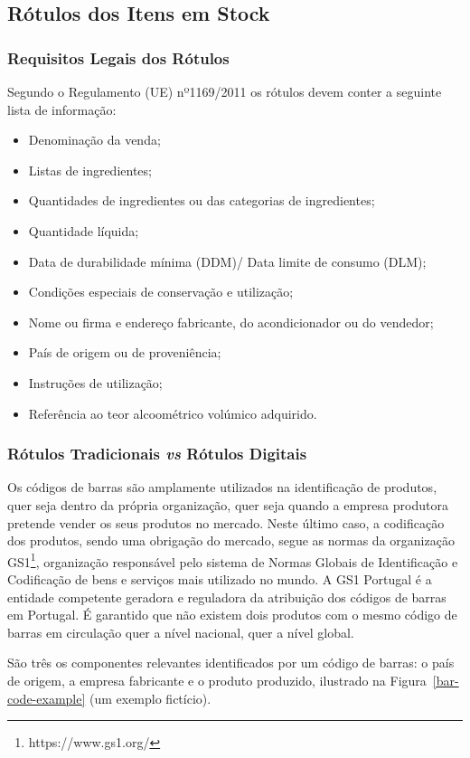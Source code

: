 %
%
\subsection{Rótulos dos Itens em Stock}
\subsubsection{Requisitos Legais dos Rótulos}
Segundo o Regulamento (UE) nº1169/2011 \cite{asae:labeling} os rótulos devem conter a seguinte lista de informação:
\begin{itemize}
    \item Denominação da venda;
    \item Listas de ingredientes;
    \item Quantidades de ingredientes ou das categorias de ingredientes;
    \item Quantidade líquida;
    \item Data de durabilidade mínima (DDM)/ Data limite de consumo (DLM);
    \item Condições especiais de conservação e utilização;
    \item Nome ou firma e endereço fabricante, do acondicionador ou do vendedor;
    \item País de origem ou de proveniência;
    \item Instruções de utilização;
    \item Referência ao teor alcoométrico volúmico adquirido.
\end{itemize}

\subsubsection{Rótulos Tradicionais \textit{vs} Rótulos Digitais}
Os códigos de barras são amplamente utilizados na identificação de produtos, quer seja dentro da própria organização, quer seja quando a empresa produtora pretende vender os seus produtos no mercado. Neste último caso, a codificação dos produtos, sendo uma obrigação do mercado, segue as normas da organização GS1\footnote[1]{https://www.gs1.org/}, organização responsável pelo sistema de Normas Globais de Identificação e Codificação de bens e serviços mais utilizado no mundo. A GS1 Portugal é a entidade competente geradora e reguladora da atribuição dos códigos de barras em Portugal. É garantido que não existem dois produtos com o mesmo código de barras em circulação quer a nível nacional, quer a nível global. 

São três os componentes relevantes identificados por um código de barras: o país de origem, a empresa fabricante e o produto produzido, ilustrado na Figura~\ref{bar-code-example} (um exemplo fictício).

